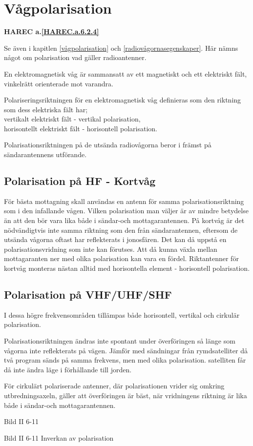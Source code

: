 \section{Vågpolarisation}
\textbf{
HAREC a.\ref{HAREC.a.6.2.4}\label{myHAREC.a.6.2.4}
}

Se även i kapitlen \ref{vågpolarisation} och \ref{radiovågornasegenskaper}.
Här nämns något om polarisation vad gäller radioantenner.

En elektromagnetisk våg är sammansatt av ett magnetiskt och ett
elektriskt fält, vinkelrätt orienterade mot varandra.

Polariseringsriktningen för en elektromagnetisk våg definieras som den riktning
som dess elektriska fält har; \\
vertikalt elektriskt fält - vertikal polarisation, \\
horisontellt elektriskt fält - horisontell polarisation.

Polarisationsriktningen på de utsända radiovågorna beror i främst på
sändarantennens utförande.

\subsection{Polarisation på HF - Kortvåg}
För bästa mottagning skall användas en antenn för samma
polarisationsriktning som i den infallande vågen. Vilken polarisation
man väljer är av mindre betydelse än att den bör vara lika både i
sändar-och mottagarantennen. På kortvåg är det nödvändigtvis inte
samma riktning som den från sändarantennen, eftersom de utsända
vågorna oftast har reflekterats i jonosfären. Det kan då uppstå en
polarisationsvridning som inte kan förutses. Att då kunna växla mellan
mottagaranten ner med olika polarisation kan vara en
fördel. Riktantenner för kortvåg monteras nästan alltid med
horisontella element - horisontell polarisation.

\subsection{Polarisation på VHF/UHF/SHF}

I dessa högre frekvensområden tillämpas både horisontell, vertikal och
cirkulär polarisation.

Polarisationsriktningen ändras inte spontant under överföringen så
länge som vågorna inte reflekterats på vägen. Jämför med sändningar
från rymdsatelliter då två program sänds på samma frekvens, men med
olika polarisation. satelliten får då inte ändra läge i förhållande
till jorden.

För cirkulärt polariserade antenner, där polarisationen vrider sig
omkring utbredningsaxeln, gäller att överföringen är bäst, när
vridningens riktning är lika både i sändar-och mottagarantennen.

Bild II 6-11

Bild II 6-11 Inverkan av polarisation
